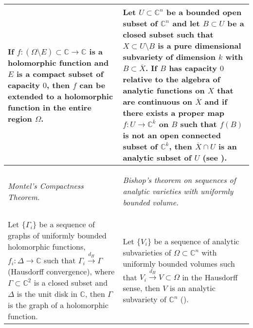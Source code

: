 \documentclass{article}
\newcommand{\co}{\ensuremath{\mathbb C }}
\newcommand{\con}{\ensuremath{\mathbb{C}^n}}
\begin{document}
\begin{table}[hpt]
\begin{tabular}{|m{5.5cm}|m{5.5cm}|}
                        \hline If $f:(\Omega\setminus E)\subset\co\rightarrow\co$ is a holomorphic function and $E$ is a compact subset
                        of capacity $0$, then $f$ can be extended to a holomorphic function
                        in the entire region $\Omega$.
                        &
                        \vspace{0.1cm}
                        Let $U\subset\con$ be a bounded open subset of $\con$ and let $B\subset U$ be a closed subset
                        such that $X\subset U\setminus B$ is a pure dimensional subvariety of dimension $k$ with $B\subset\overline{X}$.
                        If $B$ has capacity $0$ relative to the algebra of analytic functions on $X$ that are
                        continuous on $\overline{X}$ and if there exists a proper map $f:U\rightarrow\co^k$ on $B$ such that $f(B)$
                        is not an open connected subset of $\co^k$, then $\overline{X}\cap U$ is an analytic subset
                        of $U$ (see \cite[Theorem 4]{Bishop}).\\
                        \hline
                \begin{center}
                        \textit{Montel's Compactness Theorem.}
                \end{center}
                        &
                \begin{center}
                        \textit{Bishop's theorem on sequences of analytic varieties with uniformly bounded volume.}
                \end{center}\\
                \hline
                \vspace{0.1cm}
                Let $\lbrace\Gamma_i\rbrace$ be a sequence of graphs of uniformly bounded holomorphic
                functions, $f_i:\Delta\rightarrow\co$ such that $\Gamma_i\overset{d_H}\longrightarrow\Gamma$ (Hausdorff convergence),
                where $\Gamma\subset\co^2$ is a closed subset and $\Delta$ is the unit disk in $\co$,
                then $\Gamma$ is the graph of a holomorphic function.
                        &
                Let $\lbrace V_i\rbrace$ be a sequence of analytic subvarieties of $\Omega\subset\con$ with uniformly
                bounded volumes such that $V_i\overset{d_H}\longrightarrow V\subset\Omega$ in the Hausdorff sense, then
                $V$ is an analytic subvariety of $\con$ (\cite[p. 30]{Stolzenberg}). \\ \hline
        \end{tabular}
\end{table}
\end{document}
